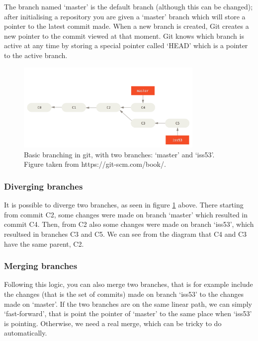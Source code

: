 \documentclass[12pt,twoside,notitlepage]{report}
\begin{document}
The branch named `master' is the default branch (although this can be changed); after initialising a repository you are given a `master' branch which will store a pointer to the latest commit made. When a new branch is created, Git creates a new pointer to the commit viewed at that moment. Git knows which branch is active at any time by storing a special pointer called `HEAD' which is a pointer to the active branch.
\begin{figure}[ht!]
\includegraphics[width=0.8\textwidth]{basic-branching_git.png}
\centering

\captionsetup{width=0.8\textwidth}
\caption[Basic branching in Git]{Basic branching in git, with two branches: `master' and `iss53'. Figure taken from https://git-scm.com/book/.}
\label{basic-branching_git}
\end{figure}

\subsubsection*{Diverging branches}
It is possible to diverge two branches, as seen in figure \ref{basic-branching_git} above. There starting from commit C2, some changes were made on branch `master' which resulted in commit C4. Then, from C2 also some changes were made on branch `iss53', which resultsed in branches C3 and C5. We can see from the diagram that C4 and C3 have the same parent, C2.

\subsubsection*{Merging branches}
Following this logic, you can also merge two branches, that is for example include the changes (that is the set of commits) made on branch `iss53' to the changes made on `master'. If the two branches are on the same linear path, we can simply `fast-forward', that is point the pointer of `master' to the same place when `iss53' is pointing. Otherwise, we need a real merge, which can be tricky to do automatically.
\end{document}
